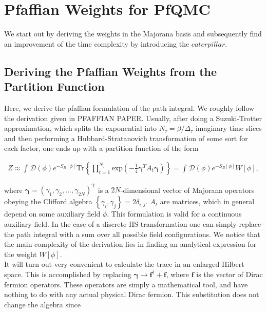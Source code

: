 \documentclass{article}
\begin{document}
	
	\tableofcontents
	

\section{Pfaffian Weights for PfQMC}

We start out by deriving the weights in the Majorana basis and subsequently find an improvement of the time complexity by introducing the $caterpillar$.

\subsection{Deriving the Pfaffian Weights from the Partition Function}
	Here, we derive the pfaffian formulation of the path integral. We roughly follow the derivation given in PFAFFIAN PAPER. Usually, after doing a Suzuki-Trotter approximation, which splits the exponential into $N_\tau = \beta / \Delta_\tau$ imaginary time slices and then performing a Hubbard-Stratanovich transformation of some sort for each factor, one ends up with a partition function of the form
	
	\begin{align}
	Z \approx \int_{ }^{ } \mathcal{D}\left(\phi\right) e^{-S_B \left[ \phi \right]} \mathrm{Tr}  \left\{\prod_{t = 1}^{N_\tau} \mathrm{exp}\left(-\frac{1}{4}\boldsymbol{\gamma}^T A_t \boldsymbol{\gamma}\right) \right\}  = \int_{ }^{ } \mathcal{D}\left(\phi\right)e^{-S_B \left[ \phi \right]}W\left[ \phi \right],
	\end{align}
	

	where $\boldsymbol{\gamma} = \left(\gamma_1,\gamma_2,...,\gamma_{2N}\right)^\mathrm{T}$ is a $2N$-dimensional vector of Majorana operators obeying the Clifford algebra $\left\{\gamma_i, \gamma_j \right\} = 2\delta_{i,j}$. $A_t$ are matrices, which in general depend on some auxiliary field $\phi$. This formulation is valid for a continuous auxiliary field. In the case of a discrete HS-transformation one can simply replace the path integral with a sum over all possible field configurations. We notice that the main complexity of the derivation lies in finding an analytical expression for the weight $W\left[ \phi \right]$.\\
	It will turn out very convenient to calculate the trace in an enlarged Hilbert space. This is accomplished by replacing $\boldsymbol{\gamma} \rightarrow \boldsymbol{f^\dagger} + \boldsymbol{f}$, where $\boldsymbol{f}$ is the vector of Dirac fermion operators. These operators are simply a mathematical tool, and have nothing to do with any actual physical Dirac fermion. This substitution does not change the algebra since 
	
\end{document}
